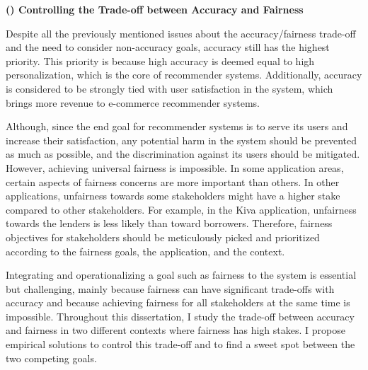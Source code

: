 \vspace{0.25cm}
\noindent \textbf{() Controlling the Trade-off between Accuracy and Fairness }
\vspace{0.25cm}

Despite all the previously mentioned issues about the accuracy/fairness trade-off and the need to consider non-accuracy goals, accuracy still has the highest priority. This priority is because high accuracy is deemed equal to high personalization, which is the core of recommender systems. Additionally, accuracy is considered to be strongly tied with user satisfaction in the system, which brings more revenue to e-commerce recommender systems. %


Although, since the end goal for recommender systems is to serve its users and increase their satisfaction, any potential harm in the system should be prevented as much as possible, and the discrimination against its users should be mitigated. However, achieving universal fairness is impossible. In some application areas, certain aspects of fairness concerns are more important than others. In other applications, unfairness towards some stakeholders might have a higher stake compared to other stakeholders. For example, in the Kiva application, unfairness towards the lenders is less likely than toward borrowers. Therefore, fairness objectives for stakeholders should be meticulously picked and prioritized according to the fairness goals, the application, and the context.

Integrating and operationalizing a goal such as fairness to the system is essential but challenging, mainly because fairness can have significant trade-offs with accuracy and because achieving fairness for all stakeholders at the same time is impossible. Throughout this dissertation, I study the trade-off between accuracy and fairness in two different contexts where fairness has high stakes. I propose empirical solutions to control this trade-off and to find a sweet spot between the two competing goals. 

